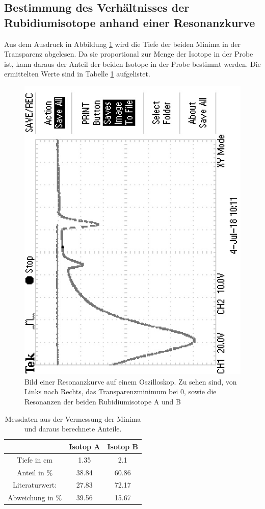 \subsection{Bestimmung des Verhältnisses der Rubidiumisotope anhand einer Resonanzkurve}
\label{subsec:iso}
Aus dem Ausdruck in Abbildung \ref{fig:Ausdruck} wird die Tiefe der beiden Minima in der Transparenz abgelesen. Da sie proportional zur Menge der Isotope in der Probe ist, kann daraus der Anteil der beiden Isotope in der Probe bestimmt werden. Die ermittelten Werte sind in Tabelle \ref{tab:Anteil} aufgelistet.
\begin{figure}[H]
  \centering
  \includegraphics[angle = 90]{TEK0022.JPG}
  \caption{Bild einer Resonanzkurve auf einem Oszilloskop. Zu sehen sind, von Links nach Rechts, das Transparenzminimum bei 0, sowie die Resonanzen der beiden Rubidiumisotope A und B}
  \label{fig:Ausdruck}
\end{figure}
\begin{table}[H]
  \centering
  \caption{Messdaten aus der Vermessung der Minima und daraus berechnete Anteile.}
  \label{tab:Anteil}
  \begin{tabular}{c|c|c}
    &Isotop A & Isotop B\\
    \hline
    Tiefe in cm& 1.35& 2.1\\
    Anteil in \%&38.84&60.86\\
    Literaturwert:&27.83&72.17\\
    Abweichung in \%&39.56&15.67\\
  \end{tabular}
\end{table}

